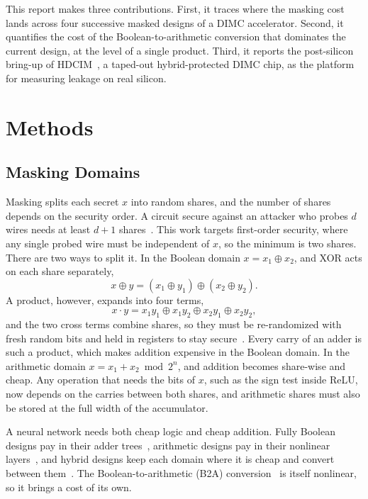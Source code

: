 \documentclass[conference]{IEEEtran}
\begin{document}
This report makes three contributions. First, it traces where the masking cost lands across four successive
masked designs of a DIMC accelerator. Second, it quantifies the cost of the Boolean-to-arithmetic conversion that
dominates the current design, at the level of a single product. Third, it reports the post-silicon bring-up of
HDCIM~\cite{pakala2024thesis}, a taped-out hybrid-protected DIMC chip, as the platform for measuring leakage on
real silicon.

\section{Methods}\label{sec:methods}
\subsection{Masking Domains}
Masking splits each secret $x$ into random shares, and the number of shares depends on the security order. A
circuit secure against an attacker who probes $d$ wires needs at least $d+1$ shares~\cite{ishai2003private}. This
work targets first-order security, where any single probed wire must be independent of $x$, so the minimum is two
shares. There are two ways to split it. In the Boolean domain $x = x_1 \oplus x_2$, and XOR acts on each share
separately,
\begin{equation}
x \oplus y = (x_1 \oplus y_1) \oplus (x_2 \oplus y_2).
\end{equation}
A product, however, expands into four terms,
\begin{equation}
x \cdot y = x_1 y_1 \oplus x_1 y_2 \oplus x_2 y_1 \oplus x_2 y_2 ,
\end{equation}
and the two cross terms combine shares, so they must be re-randomized with fresh random bits and held in
registers to stay secure~\cite{gross2016dom}. Every carry of an adder is such a product, which makes addition
expensive in the Boolean domain. In the arithmetic domain $x = x_1 + x_2 \bmod 2^n$, and addition becomes
share-wise and cheap. Any operation that needs the bits of $x$, such as the sign test inside ReLU, now depends
on the carries between both shares, and arithmetic shares must also be stored at the full width of the
accumulator.

A neural network needs both cheap logic and cheap addition. Fully Boolean designs pay in their adder
trees~\cite{ashok2025imc}, arithmetic designs pay in their nonlinear layers~\cite{dubey2020maskednet}, and
hybrid designs keep each domain where it is cheap and convert between them~\cite{dubey2022modulonet}. The
Boolean-to-arithmetic (B2A) conversion~\cite{goubin2001b2a,shahmirzadi2024b2a} is itself nonlinear, so it
brings a cost of its own.
\end{document}
